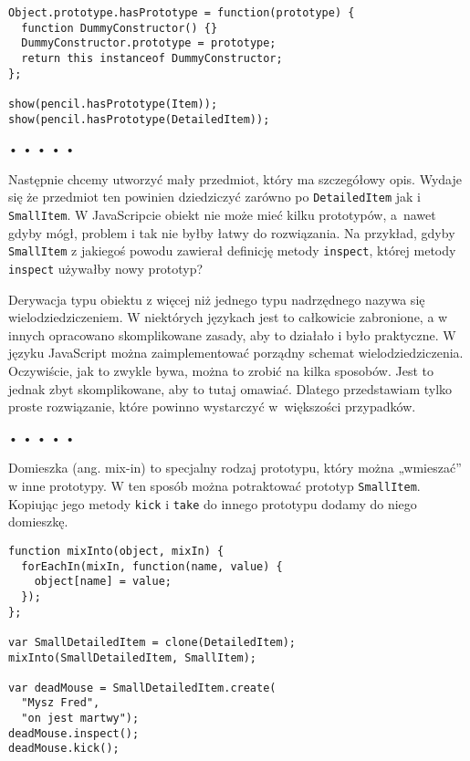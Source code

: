   
\begin{verbatim} 
Object.prototype.hasPrototype = function(prototype) {
  function DummyConstructor() {}
  DummyConstructor.prototype = prototype;
  return this instanceof DummyConstructor;
};

show(pencil.hasPrototype(Item));
show(pencil.hasPrototype(DetailedItem));
 \end{verbatim}


\begin{center}
• • • • •
\end{center}

  
Następnie chcemy utworzyć mały przedmiot, który ma szczegółowy opis. Wydaje się że przedmiot ten powinien dziedziczyć zarówno po \texttt{DetailedItem} jak i \texttt{SmallItem}. W JavaScripcie obiekt nie może mieć kilku prototypów, a~nawet gdyby mógł, problem i tak nie byłby łatwy do rozwiązania. Na przykład, gdyby \texttt{SmallItem} z jakiegoś powodu zawierał definicję metody \texttt{inspect}, której metody \texttt{inspect} używałby nowy prototyp?

  
Derywacja typu obiektu z więcej niż jednego typu nadrzędnego nazywa się wielodziedziczeniem. W niektórych językach jest to całkowicie zabronione, a w innych opracowano skomplikowane zasady, aby to działało i było praktyczne. W języku JavaScript można zaimplementować porządny schemat wielodziedziczenia. Oczywiście, jak to zwykle bywa, można to zrobić na kilka sposobów. Jest to jednak zbyt skomplikowane, aby to tutaj omawiać. Dlatego przedstawiam tylko proste rozwiązanie, które powinno wystarczyć w~większości przypadków.



\begin{center}
• • • • •
\end{center}

  
Domieszka (ang. mix-in) to specjalny rodzaj prototypu, który można „wmieszać” w inne prototypy. W ten sposób można potraktować prototyp \texttt{SmallItem}. Kopiując jego metody \texttt{kick} i \texttt{take} do innego prototypu dodamy do niego domieszkę.

  
\begin{verbatim} 
function mixInto(object, mixIn) {
  forEachIn(mixIn, function(name, value) {
    object[name] = value;
  });
};

var SmallDetailedItem = clone(DetailedItem);
mixInto(SmallDetailedItem, SmallItem);

var deadMouse = SmallDetailedItem.create(
  "Mysz Fred",
  "on jest martwy");
deadMouse.inspect();
deadMouse.kick();
 \end{verbatim}
  
